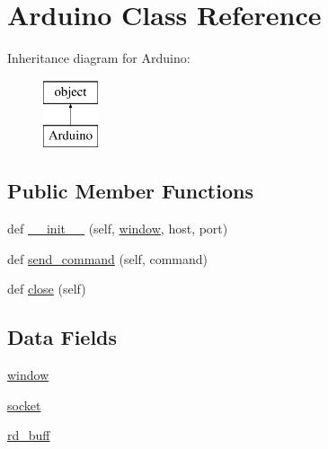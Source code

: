\hypertarget{class_snake_01_projekt_01auf_01_python_1_1_arduino}{}\section{Arduino Class Reference}
\label{class_snake_01_projekt_01auf_01_python_1_1_arduino}
Inheritance diagram for Arduino\+:\begin{figure}[H]
\begin{center}
\leavevmode
\includegraphics[height=2.000000cm]{class_snake_01_projekt_01auf_01_python_1_1_arduino}
\end{center}
\end{figure}
\subsection*{Public Member Functions}
\begin{DoxyCompactItemize}
\item 
def \mbox{\hyperlink{class_snake_01_projekt_01auf_01_python_1_1_arduino_a3fa102a2756b367e66a90d9f678cd250}{\+\_\+\+\_\+init\+\_\+\+\_\+}} (self, \mbox{\hyperlink{class_snake_01_projekt_01auf_01_python_1_1_arduino_a04a8a2bbfa9c15500892b8e5033d625b}{window}}, host, port)
\item 
def \mbox{\hyperlink{class_snake_01_projekt_01auf_01_python_1_1_arduino_a05097bd2ea4ca3b2c17d7b7164a67539}{send\+\_\+command}} (self, command)
\item 
def \mbox{\hyperlink{class_snake_01_projekt_01auf_01_python_1_1_arduino_a8639372c33e15084a7f7c4d9d87b7bfe}{close}} (self)
\end{DoxyCompactItemize}
\subsection*{Data Fields}
\begin{DoxyCompactItemize}
\item 
\mbox{\hyperlink{class_snake_01_projekt_01auf_01_python_1_1_arduino_a04a8a2bbfa9c15500892b8e5033d625b}{window}}
\item 
\mbox{\hyperlink{class_snake_01_projekt_01auf_01_python_1_1_arduino_a84edc84c8145e7997b70f9919ce44d68}{socket}}
\item 
\mbox{\hyperlink{class_snake_01_projekt_01auf_01_python_1_1_arduino_a1ea8c1aa4f00109a4c17150885fd08c8}{rd\+\_\+buff}}
\end{DoxyCompactItemize}


